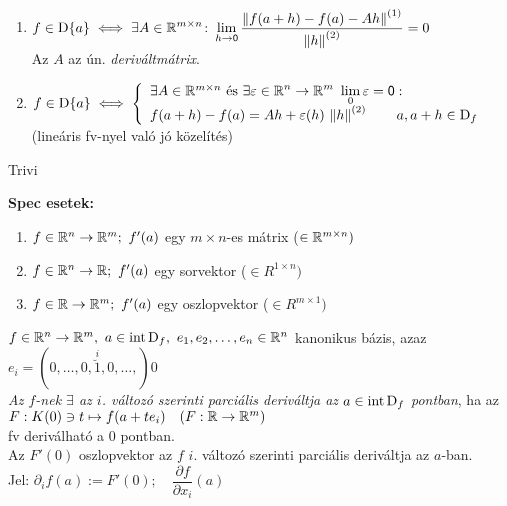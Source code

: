 \begin{te}\ 
  \begin{enumerate}
    \item $\displaystyle f\in\operatorname{D}\{a\} \iff  \exists A\in\mathbb{R}^{m\times n}\colon  \lim_{h\to\mathsf{0}} \dfrac{\left\Vert f(a+h) -f(a) -Ah\right\Vert^{(1)}}{
    \left\Vert h\right\Vert^{(2)}} = 0$\\
      Az $A$ az ún. \emph{deriváltmátrix}.
    \item $f\in\operatorname{D}\{a\}  \iff \left\{\begin{array}{l}\exists A\in\mathbb{R}^{m\times n} \text{  és } \displaystyle\exists \varepsilon \in\mathbb{R}^n\to\mathbb{R}^m\
    \lim_0\varepsilon=\mathsf{0} :\\f(a+h) -f(a)= Ah + \varepsilon(h)\,\left\Vert h\right\Vert^{(2)}\qquad a,a+h\in \operatorname{D}_f\end{array}\right.$\\
      (lineáris fv-nyel való jó közelítés)
  \end{enumerate}
\end{te}
\begin{biz}Trivi\end{biz}
  

\textbf{Spec esetek:}
\begin{enumerate}
  \item $f\in\mathbb{R}^n\to\mathbb{R}^m;\ f'(a)$ egy $m\times n$-es mátrix ($\in\mathbb{R}^{m\times n})$
  \item $f\in\mathbb{R}^n\to\mathbb{R};\ f'(a)$ egy sorvektor  ($\in R^{1\times n})$
  \item $f\in\mathbb{R}\to\mathbb{R}^m;\ f'(a)$ egy oszlopvektor ($\in R^{m\times1})$   
\end{enumerate}

\begin{de}
  $f\in\RnRm,\ a\in\intD_f,\ e_1,e_2,\dotsc,e_n\in\R^n$ kanonikus bázis, azaz $e_i = (0,\dotsc,0,
  \overset{i}{\breve{1}}, 0,\dotsc,)0 $\\
  \emph{Az $f$-nek $\exists$ az $i$. változó szerinti parciális deriváltja az $a\in\operatorname{int\,D}_f$ pontban}, ha az\\
  $F: K(0)\owns t \mapsto f(a+t e_i)\quad (F: \mathbb{R}\to\mathbb{R}^m)$\\
  fv deriválható a $0$ pontban.\\
  Az $F'(0)$ oszlopvektor az $f$ $i$. változó szerinti parciális deriváltja az $a$-ban.\\
  Jel: $\partial_i f(a) := F'(0);\quad \dfrac {\partial f}{\partial {x_i}}(a)$ 
\end{de}


